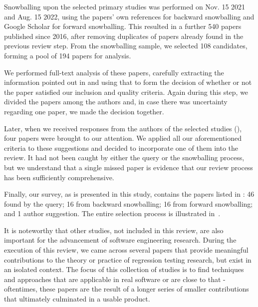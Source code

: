 Snowballing upon the selected primary studies was performed on Nov. 15 2021 and Aug. 15 2022, using the papers' own references for backward snowballing and Google Scholar for forward snowballing.
This resulted in a further 540 papers published since 2016, after removing duplicates of papers already found in the previous review step.
From the snowballing sample, we selected 108 candidates, forming a pool of 194 papers for analysis.

We performed full-text analysis of these papers, carefully extracting the information pointed out in  and using that to form the decision of whether or not the paper satisfied our inclusion and quality criteria.
Again during this step, we divided the papers among the authors and, in case there was uncertainty regarding one paper, we made the decision together.

Later, when we received responses from the authors of the selected studies (), four papers were brought to our attention.
We applied all our aforementioned criteria to these suggestions and decided to incorporate one of them into the review.
It had not been caught by either the query or the snowballing process, but we understand that a single missed paper is evidence that our review process has been sufficiently comprehensive.

Finally, our survey, as is presented in this study, contains the \numpapers papers listed in : 46 found by the query; 16 from backward snowballing; 16 from forward snowballing; and 1 author suggestion.
The entire selection process is illustrated in~.

It is noteworthy that other studies, not included in this review, are also important for the advancement of software engineering research.
During the execution of this review, we came across several papers that provide meaningful contributions to the theory or practice of regression testing research, but exist in an isolated context.
The focus of this collection of studies is to find techniques and approaches that are applicable in real software or are close to that \-- oftentimes, these papers are the result of a longer series of smaller contributions that ultimately culminated in a usable product.

